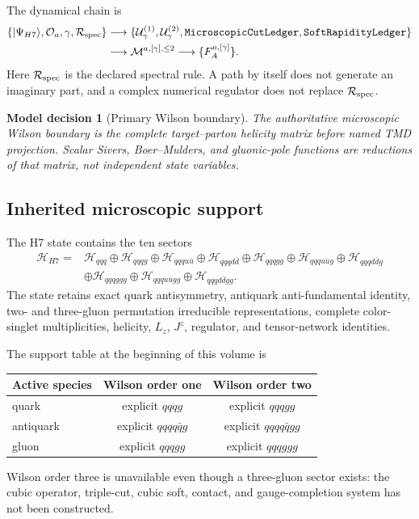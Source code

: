 \documentclass[11pt]{article}
\newtheorem{decision}[definition]{Model decision}
\newcommand{\Hil}{\mathcal H}
\newcommand{\cO}{\mathcal O}
\newcommand{\cM}{\mathcal M}
\newcommand{\cR}{\mathcal R}
\newcommand{\cU}{\mathcal U}
\newcommand{\CutLedger}{\texttt{MicroscopicCutLedger}}
\newcommand{\SoftLedger}{\texttt{SoftRapidityLedger}}
\begin{document}
The dynamical chain is
\begin{equation}
 \begin{aligned}
 \{ |\Psi_{H7}\rangle,\cO_a,\gamma,\cR_{\rm spec}\}
 &\longrightarrow
 \{\cU_\gamma^{(1)},\cU_\gamma^{(2)},\CutLedger,\SoftLedger\}
 \\
 &\longrightarrow
 \cM^{a,[\gamma],\leq2}
 \longrightarrow
 \{F_A^{a,[\gamma]}\}.
 \end{aligned}
 \label{eq:full-chain}
\end{equation}
Here \(\cR_{\rm spec}\) is the declared spectral rule.  A path by itself does
not generate an imaginary part, and a complex numerical regulator does not
replace \(\cR_{\rm spec}\).

\begin{decision}[Primary Wilson boundary]
The authoritative microscopic Wilson boundary is the complete target--parton
helicity matrix before named TMD projection.  Scalar Sivers, Boer--Mulders,
and gluonic-pole functions are reductions of that matrix, not independent
state variables.
\end{decision}

\subsection{Inherited microscopic support}

The H7 state contains the ten sectors
\begin{align}
 \Hil_{H7}={}&
 \Hil_{qqq}\oplus\Hil_{qqqg}
 \oplus\Hil_{qqqu\bar u}\oplus\Hil_{qqqd\bar d}
 \oplus\Hil_{qqqgg}
 \oplus\Hil_{qqqu\bar u g}\oplus\Hil_{qqqd\bar d g}
 \nonumber\\
 &\oplus\Hil_{qqqggg}
 \oplus\Hil_{qqqu\bar u gg}
 \oplus\Hil_{qqqd\bar d gg}.
 \label{eq:h7-space}
\end{align}
The state retains exact quark antisymmetry, antiquark anti-fundamental
identity, two- and three-gluon permutation irreducible representations,
complete color-singlet multiplicities, helicity, \(L_z\), \(J^z\), regulator,
and tensor-network identities.

The support table at the beginning of this volume is
\begin{center}
\begin{tabular}{lcc}
\toprule
Active species & Wilson order one & Wilson order two\\
\midrule
quark & explicit \(qqqg\) & explicit \(qqqgg\)\\
antiquark & explicit \(qqqq\bar q g\) & explicit \(qqqq\bar q gg\)\\
gluon & explicit \(qqqgg\) & explicit \(qqqggg\)\\
\bottomrule
\end{tabular}
\end{center}
Wilson order three is unavailable even though a three-gluon sector exists:
the cubic operator, triple-cut, cubic soft, contact, and gauge-completion
system has not been constructed.
\end{document}
